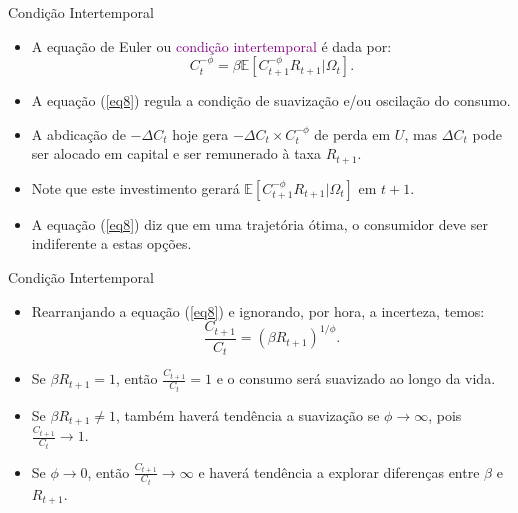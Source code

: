 \documentclass[10pt]{beamer}
\begin{document}
\begin{frame}{Condição Intertemporal}
    \begin{itemize}
        \item A equação de Euler ou \textcolor{purple}{condição intertemporal} é dada por:
        \begin{equation}
            C_t^{-\phi} = \beta \mathbb{E}[C_{t+1}^{-\phi} R_{t+1}|\Omega_t]. \label{eq8}
        \end{equation}
        \bigskip
        \item A equação (\ref{eq8}) regula a condição de suavização e/ou oscilação do consumo.
        \bigskip
        \item A abdicação de $-\Delta C_t$ hoje gera $-\Delta C_t \times C_t^{-\phi}$ de perda em $U$, mas $\Delta C_t$ pode ser alocado em capital e ser remunerado à taxa $R_{t+1}$.
        \bigskip
        \item Note que este investimento gerará $\mathbb{E}[C_{t+1}^{-\phi} R_{t+1}|\Omega_t]$ em $t+1$.
        \bigskip
        \item A equação (\ref{eq8}) diz que em uma trajetória ótima, o consumidor deve ser indiferente a estas opções.
    \end{itemize}
\end{frame}

\begin{frame}{Condição Intertemporal}
    \begin{itemize}
        \item Rearranjando a equação (\ref{eq8}) e ignorando, por hora, a incerteza, temos:
        \[
        \frac{C_{t+1}}{C_t} = (\beta R_{t+1})^{1/\phi}.
        \]
        \bigskip
        \item Se $\beta R_{t+1} = 1$, então $\frac{C_{t+1}}{C_t} = 1$ e o consumo será suavizado ao longo da vida.
        \bigskip
        \item Se $\beta R_{t+1} \neq 1$, também haverá tendência a suavização se $\phi \to \infty$, pois $\frac{C_{t+1}}{C_t} \to 1$.
        \bigskip
        \item Se $\phi \to 0$, então $\frac{C_{t+1}}{C_t} \to \infty$ e haverá tendência a explorar diferenças entre $\beta$ e $R_{t+1}$.
    \end{itemize}
\end{frame}
\end{document}
